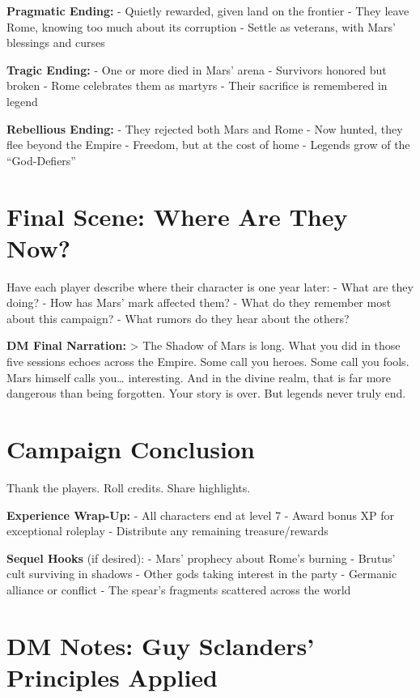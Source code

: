 \documentclass[
]{book}
\begin{document}
\textbf{Pragmatic Ending:} - Quietly rewarded, given land on the
frontier - They leave Rome, knowing too much about its corruption -
Settle as veterans, with Mars' blessings and curses

\textbf{Tragic Ending:} - One or more died in Mars' arena - Survivors
honored but broken - Rome celebrates them as martyrs - Their sacrifice
is remembered in legend

\textbf{Rebellious Ending:} - They rejected both Mars and Rome - Now
hunted, they flee beyond the Empire - Freedom, but at the cost of home -
Legends grow of the ``God-Defiers''

\section{Final Scene: Where Are They
Now?}\label{final-scene-where-are-they-now}

Have each player describe where their character is one year later: -
What are they doing? - How has Mars' mark affected them? - What do they
remember most about this campaign? - What rumors do they hear about the
others?

\textbf{DM Final Narration:} \textgreater{} The Shadow of Mars is long.
What you did in those five sessions echoes across the Empire. Some call
you heroes. Some call you fools. Mars himself calls you\ldots{}
interesting. And in the divine realm, that is far more dangerous than
being forgotten. Your story is over. But legends never truly end.

\section{Campaign Conclusion}\label{campaign-conclusion}

Thank the players. Roll credits. Share highlights.

\textbf{Experience Wrap-Up:} - All characters end at level 7 - Award
bonus XP for exceptional roleplay - Distribute any remaining
treasure/rewards

\textbf{Sequel Hooks} (if desired): - Mars' prophecy about Rome's
burning - Brutus' cult surviving in shadows - Other gods taking interest
in the party - Germanic alliance or conflict - The spear's fragments
scattered across the world

\section{DM Notes: Guy Sclanders' Principles
Applied}\label{dm-notes-guy-sclanders-principles-applied}
\end{document}
